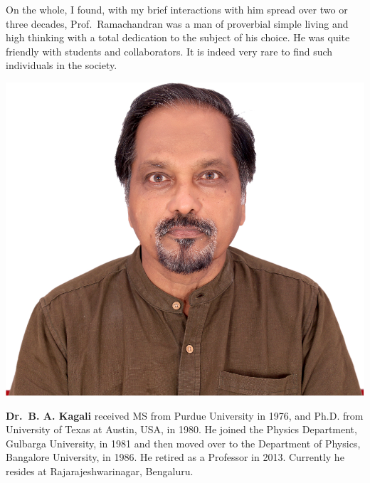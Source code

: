 On the whole, I found, with my brief interactions with him spread over two or three decades, Prof.\ Ramachandran was a man of proverbial simple living and high thinking with a total dedication to the subject of his choice. He was quite friendly with students and collaborators. It is indeed very rare to find such individuals in the society.
\bigskip

\centerline{\includegraphics[scale=.6]{authorsphotos/Prof_B_A_Kagali.jpg}}
\bigskip

\noindent
\textbf{Dr.\ B. A. Kagali} received MS from Purdue University in 1976, and Ph.D. from University of Texas at Austin, USA, in 1980. He joined the Physics Department, Gulbarga University, in 1981 and then moved over to the Department of Physics, Bangalore University, in 1986. He retired as a Professor in 2013. Currently he resides at Rajarajeshwarinagar, Bengaluru.
